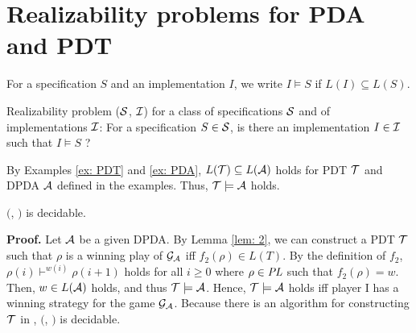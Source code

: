 \section{Realizability problems for PDA and PDT}
For a specification $S$ and an implementation $I$,
we write $I \models S$ if $L(I) \subseteq L(S)$.

\begin{definition}
Realizability problem \Real (${\cal S}$, ${\cal I}$) for a class of specifications ${\cal S}$ and of implementations ${\cal I}$: For a specification $S\in{\cal S}$, is there an implementation $I\in{\cal I}$ such that $I \models S$ ?
\end{definition}

\begin{example}
By Examples \ref{ex: PDT} and \ref{ex: PDA},
$L({\cal T})\subseteq L({\cal A})$ holds for PDT ${\cal T}$ and DPDA ${\cal A}$
defined in the examples.
Thus, ${\cal T}\models{\cal A}$ holds.
\end{example}

\begin{theorem}\label{the: DPDA}
\Real $($\DPDA, \PDT$)$ is decidable.
\end{theorem}
{\bf Proof.}\quad
Let ${\cal A}$ be a given DPDA.
By Lemma \ref{lem: 2},
we can construct a PDT ${\cal T}$ such that
$\rho$ is a winning play of ${\cal G}_{\cal A}$ iff $f_2(\rho)\in L(T)$.
By the definition of $f_2$,
$\rho(i)\vdash^{w(i)} \rho(i+1)$ holds
for all $i\geq 0$ where $\rho\in\mathit{PL}$ such that $f_2(\rho)=w$.
Then, $w\in L({\cal A})$ holds, and thus ${\cal T}\models{\cal A}$.
Hence, ${\cal T}\models{\cal A}$ holds iff player I has a winning strategy for the game ${\cal G}_{\cal A}$.
Because there is an algorithm for constructing ${\cal T}$
in \cite{Wa96}, \Real $($\DPDA, \PDT$)$ is decidable.

